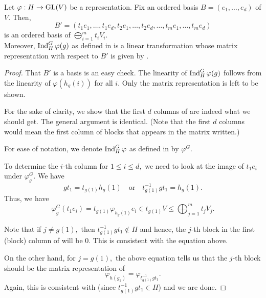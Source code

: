 
\begin{thm} \label{thm:inducedmatrixandabs}
	Let $\varphi : H \to \operatorname{GL}(V)$ be a representation. 
	Fix an ordered basis $B = (e_1, \ldots, e_d)$ of $V.$ Then,
	\begin{equation*} 
		B' = (t_1e_1, \ldots, t_1e_d, t_2e_1, \ldots, t_2e_d, \ldots, t_me_1, \ldots, t_me_d)
	\end{equation*}
	is an ordered basis of $\bigoplus_{i = 1}^m t_iV_i.$ \\
	Moreover, $\operatorname{Ind}^{G}_{H}\varphi(g)$ as defined in  is a linear transformation whose matrix representation with respect to $B'$ is given by .
\end{thm}
\begin{proof} 
	That $B'$ is a basis is an easy check. The linearity of $\operatorname{Ind}^{G}_{H}\varphi(g)$ follows from the linearity of $\varphi(h_g(i))$ for all $i.$ Only the matrix representation is left to be shown.

	For the sake of clarity, we show that the first $d$ columns of  are indeed what we should get. The general argument is identical. (Note that the first $d$ columns would mean the first column of blocks that appears in the matrix written.)

	For ease of notation, we denote $\operatorname{Ind}^{G}_{H}\varphi$ as defined in  by $\varphi^G.$

	To determine the $i$-th column for $1 \le i \le d,$ we need to look at the image of $t_1e_i$ under $\varphi^G_g.$ We have
	\begin{equation*} 
		gt_1 = t_{g(1)}h_g(1) \quad\text{or}\quad t_{g(1)}^{-1}gt_1 = h_g(1).
	\end{equation*}
	Thus, we have
	\begin{equation*} 
		\varphi^G_g(t_1e_i) = t_{g(1)}\varphi_{h_g(1)}e_i \in t_{g(1)}V \le \bigoplus_{j = 1}^m t_jV_j.
	\end{equation*}

	Note that if $j \neq g(1),$ then $t_{g(1)}^{-1}gt_1 \notin H$ and hence, the $j$-th block in the first (block) column of  will be $0.$ This is consistent with the equation above.

	On the other hand, for $j = g(1),$ the above equation tells us that the $j$-th block should be the matrix representation of 
	\begin{equation*} 
		\varphi_{h(g_1)} = \varphi_{t_{g(1)}^{-1}gt_1}.
	\end{equation*}
	Again, this is consistent with  (since $t_{g(1)}^{-1}gt_1 \in H$) and we are done.
\end{proof}

